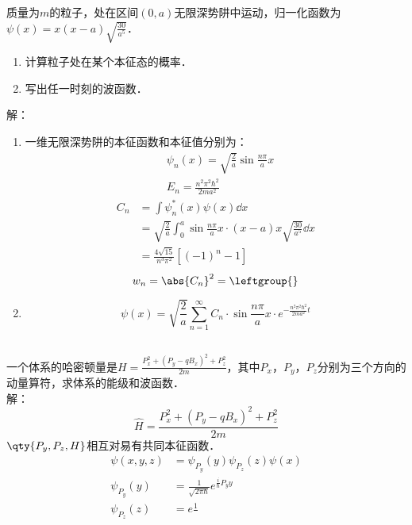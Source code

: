 \subsection{ }
质量为$m$的粒子，处在区间$(0,a)$无限深势阱中运动，归一化函数为$\psi(x)=x(x-a)\sqrt{\frac{30}{a^5}} $．
\begin{enumerate}
\item 计算粒子处在某个本征态的概率．
\item 写出任一时刻的波函数．
\end{enumerate}
解：
\begin{enumerate}
\item 一维无限深势阱的本征函数和本征值分别为：
\begin{align}
&\psi_n(x)=\sqrt{\frac{2}{a}}\sin{\frac{n\pi}{a}x}\\
&E_n=\frac{n^2\pi^2\hbar^2}{2ma^2}
\end{align}
\begin{equation}
\begin{aligned}
C_n &=\int\psi^{*}_{n}(x)\psi(x)\dd{x}\\
&=\sqrt{\frac{2}{a}}\int^{a}_{0}\sin{\frac{n\pi}{a}x}\cdot(x-a)x\sqrt{\frac{30}{a^5}}\dd{x}\\
&=\frac{4\sqrt{15}}{n^3\pi^2}[(-1)^n-1]
\end{aligned}
\end{equation}
\begin{equation}
w_n=\abs{C_n}^2=\leftgroup{}
\end{equation}
\item 
\begin{equation}
\psi(x)=\sqrt{\frac{2}{a}}\sum^{\infty}_{n=1}C_n\cdot\sin{\frac{n\pi}{a}x}\cdot e^{-\frac{n^2\pi^2\hbar^2}{2ma^2}t}
\end{equation}
\end{enumerate}
\subsection{ }
一个体系的哈密顿量是$H=\frac{P^2_x+(P_y-qB_x)^2+P^2_z}{2m}$，其中$P_x$，$P_y$，$P_z$分别为三个方向的动量算符，求体系的能级和波函数．\\
解：
\begin{equation}
\hat{H}=\frac{P^2_x+(P_y-qB_x)^2+P^2_z}{2m}
\end{equation}
$\qty{P_y,P_z,H}$相互对易有共同本征函数．\\
\begin{equation}
\begin{aligned}
\psi(x,y,z)&=\psi_{P_y}(y)\psi_{P_z}(z)\psi(x)\\
\psi_{P_y}(y)&=\frac{1}{\sqrt{2\pi\hbar}}e^{\frac{i}{\hbar}P_{y} y}\\
\psi_{P_z}(z)&=e\frac{1}{}
\end{aligned}
\end{equation}
